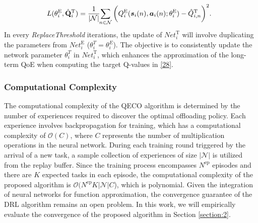 \documentclass[10pt, journal,letterpaper]{IEEEtran}
\begin{document}
	
\begin{alignat}{1}
	\hspace{-2mm}L(\theta_i^{\text{E}},\hat{\mathbf{Q}}_i^{\text{T}}) = {1 \over |\mathcal{N}| }\hspace{-1mm} \sum\limits_{n \in \mathcal{N}} \bigg(Q_i^{\text{E}}(\boldsymbol{s}_i(n) , \boldsymbol{a}_i(n); \theta_i^{\text{E}} ) -   \hat{Q}^{\text{T}}_{i,n}  \bigg)^2.
	\label{31}  
\end{alignat}  
In every \textit{ReplaceThreshold} iterations, the update of $\textit{Net}_i^{\text{T}}$ will involve duplicating the parameters from $\textit{Net}_i^{\text{E}}$ ($\theta_i^{T} = \theta_i^{E}$). The objective is to consistently update the network parameter $\theta_i^{T}$ in $\textit{Net}_i^{\text{T}}$, which enhances the approximation of the long-term QoE when computing the target Q-values in \eqref{28}.\\

\subsubsection{Computational Complexity}


The computational complexity of the QECO algorithm is determined by the number of experiences required to discover the optimal offloading policy. Each experience involves backpropagation for training, which has a computational complexity of $\mathcal{O}(C)$, where $C$ represents the number of multiplication operations in the neural network. During each training round triggered by the arrival of a new task, a sample collection of experiences of size $|\mathcal{N}|$ is utilized from the replay buffer. Since the training process encompasses $N^{\text{ep}}$ episodes and there are $K$ expected tasks in each episode, the computational complexity of the proposed algorithm is $\mathcal{O}(N^{\text{ep}}K|\mathcal{N}|C$), which is polynomial. Given the integration of neural networks for function approximation, the convergence guarantee of the DRL algorithm remains an open problem. In this work, we will empirically evaluate the convergence of the proposed algorithm in Section \ref{section:2}.

\end{document}
